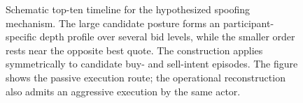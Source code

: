 \begin{figure}[htbp]
{%
    }
    \caption{Schematic top-ten timeline for the hypothesized spoofing mechanism. The large candidate posture forms an
    participant-specific depth profile over several bid levels, while the smaller order rests near the opposite best quote. The
    construction applies symmetrically to candidate buy- and sell-intent episodes. The figure shows the passive execution
    route; the operational reconstruction also admits an aggressive execution by the same actor.}
    \label{fig:topn_spoofing_timeline}
\end{figure}
\FloatBarrier

